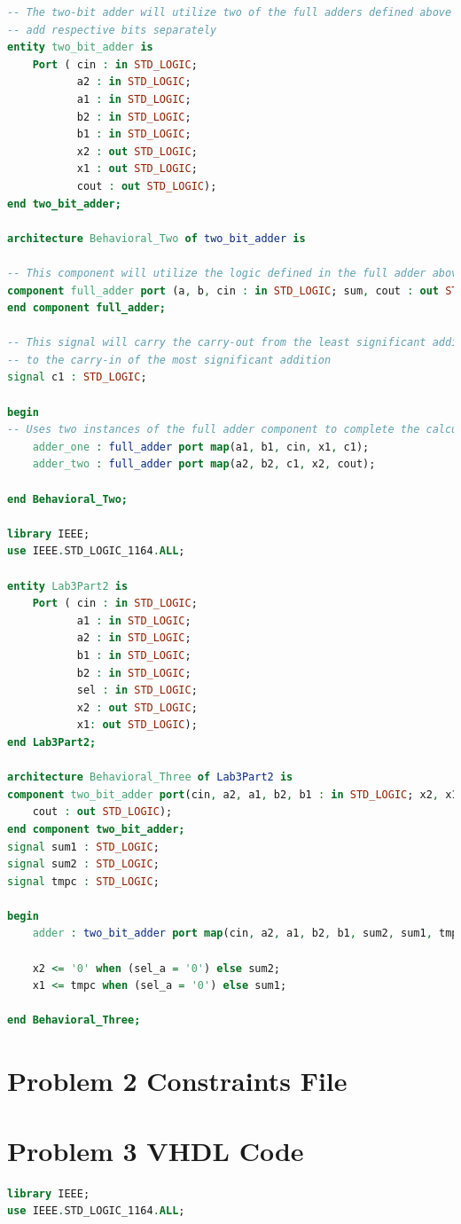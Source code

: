\documentclass[11pt]{article}
\begin{document}
\begin{appendices}
\begin{lstlisting}[language=VHDL]
-- The two-bit adder will utilize two of the full adders defined above to 
-- add respective bits separately
entity two_bit_adder is
    Port ( cin : in STD_LOGIC;
           a2 : in STD_LOGIC;
           a1 : in STD_LOGIC;
           b2 : in STD_LOGIC;
           b1 : in STD_LOGIC;
           x2 : out STD_LOGIC;
           x1 : out STD_LOGIC;
           cout : out STD_LOGIC);
end two_bit_adder;

architecture Behavioral_Two of two_bit_adder is

-- This component will utilize the logic defined in the full adder above
component full_adder port (a, b, cin : in STD_LOGIC; sum, cout : out STD_LOGIC);
end component full_adder;

-- This signal will carry the carry-out from the least significant addition
-- to the carry-in of the most significant addition
signal c1 : STD_LOGIC;

begin
-- Uses two instances of the full adder component to complete the calculation
    adder_one : full_adder port map(a1, b1, cin, x1, c1);
    adder_two : full_adder port map(a2, b2, c1, x2, cout);

end Behavioral_Two;

library IEEE;
use IEEE.STD_LOGIC_1164.ALL;

entity Lab3Part2 is
    Port ( cin : in STD_LOGIC;
           a1 : in STD_LOGIC;
           a2 : in STD_LOGIC;
           b1 : in STD_LOGIC;
           b2 : in STD_LOGIC;
           sel : in STD_LOGIC;
           x2 : out STD_LOGIC;
           x1: out STD_LOGIC);
end Lab3Part2;

architecture Behavioral_Three of Lab3Part2 is
component two_bit_adder port(cin, a2, a1, b2, b1 : in STD_LOGIC; x2, x1, 
	cout : out STD_LOGIC);
end component two_bit_adder;
signal sum1 : STD_LOGIC;
signal sum2 : STD_LOGIC;
signal tmpc : STD_LOGIC;

begin
    adder : two_bit_adder port map(cin, a2, a1, b2, b1, sum2, sum1, tmpc);
    
    x2 <= '0' when (sel_a = '0') else sum2;
    x1 <= tmpc when (sel_a = '0') else sum1;    

end Behavioral_Three;
\end{lstlisting}

\section{Problem 2 Constraints File}

\section{Problem 3 VHDL Code}
\begin{lstlisting}[language=VHDL]
library IEEE;
use IEEE.STD_LOGIC_1164.ALL;


\end{lstlisting}
\end{appendices}
\end{document}
